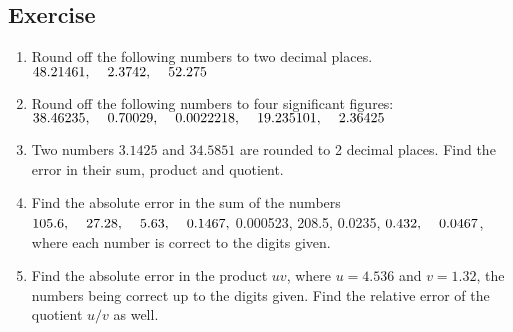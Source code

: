 \documentclass[aima203_lecturenotes_ku.tex]{subfiles}
\begin{document}
\subsection{Exercise}
\begin{enumerate}
\item Round off the following numbers to two decimal places. \\
  \(48.21461, \hspace{4mm} 2.3742, \hspace{4mm} 52.275 \)

\item  Round off the following numbers to four significant figures: \\
  \(38.46235, \hspace{4mm} 0.70029, \hspace{4mm} 0.0022218, \hspace{4mm} 19.235101, \hspace{4mm} 2.36425\)

\item Two numbers \(3.1425\) and \(34.5851\) are rounded to 2 decimal places. Find the error in their sum, product and quotient.

\item Find the absolute error in the sum of the numbers \(105.6, \hspace{4mm} 27.28, \hspace{4mm} 5.63, \hspace{4mm} 0.1467, \)  \hspace{4mm} 0.000523, \hspace{4mm} 208.5, \hspace{4mm} 0.0235, \hspace{4mm} \(0.432, \hspace{4mm} 0.0467\), where each number is correct to the digits given.

\item Find the absolute error in the product $uv$, where $u=4.536$ and $v=1.32$, the numbers being correct up to the digits given. Find the relative error of the quotient $u/v$ as well.
\end{enumerate}
\end{document}
